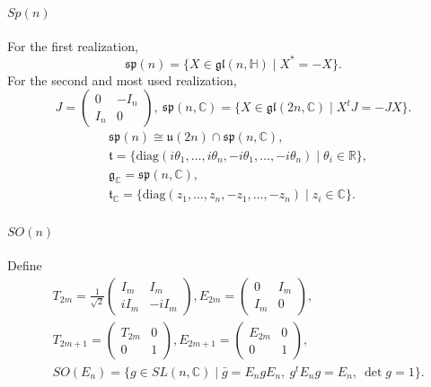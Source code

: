 \documentclass{article}
\theoremstyle{definition}
\theoremstyle{plain}
\begin{document}
\paragraph{$ Sp(n) $}

For the first realization, \[
    \mathfrak{sp}(n)=\{X\in \mathfrak{gl}(n,\mathbb{H})\mid X^*=-X\}.
\]
For the second and most used realization,\[
    J=\begin{pmatrix}
        0 & -I_n\\ I_n & 0
    \end{pmatrix},\ \mathfrak{sp}(n,\mathbb{C} )=\{X\in \mathfrak{gl}(2n,\mathbb{C} )\mid X^t J=-JX\}.
\]
\begin{align*}
    &\mathfrak{sp}(n)\cong \mathfrak{u}(2n)\cap \mathfrak{sp}(n,\mathbb{C} ),\\
    & \mathfrak{t}=\{\mathrm{diag}(i\theta_1,\dots,i\theta_n,-i\theta_1,\dots,-i\theta_n)\mid \theta_i\in \mathbb{R}\},\\
    & \mathfrak{g}_{\mathbb{C} }=\mathfrak{sp}(n,\mathbb{C} ),\\
    & \mathfrak{t}_{\mathbb{C} }=\{\mathrm{diag}(z_1,\dots,z_n,-z_1,\dots,-z_n)\mid z_i\in \mathbb{C} \}.
\end{align*}

\paragraph{$ SO(n) $}
Define
\begin{align*}
    &T_{2m}=\frac{1}{\sqrt{2}}\left(\begin{matrix}
    I_m & I_m \\ iI_m & -i I_m
    \end{matrix}\right), E_{2m}=\left(\begin{matrix}
    0 & I_m \\ I_m & 0
    \end{matrix}\right),\\
    & T_{2m+1}=\left(\begin{matrix}
    T_{2m} & 0 \\ 0 & 1
    \end{matrix}\right), E_{2m+1}=\left(\begin{matrix}
    E_{2m} & 0 \\ 0 & 1
    \end{matrix}\right),\\
    & SO(E_n)=\{g\in SL(n,\mathbb{C} )\mid \bar{g}=E_n g E_n,\ g^t E_n g=E_n,\ \det g=1\}.
\end{align*}
\end{document}

